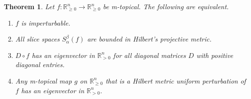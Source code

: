 \documentclass[10pt,reqno]{amsart}
\newcommand{\R}{\mathbb{R}}
\theoremstyle{plain}
\newtheorem{theorem}{Theorem}[section]
\theoremstyle{definition}
\numberwithin{equation}{section}
\begin{document}
\begin{theorem} \label{thm:slice}
Let $f: \R^n_{\ge 0} \rightarrow \R^n_{\ge 0}$ be m-topical. The following are equivalent. 
\begin{enumerate}
\item \label{item:def} $f$ is imperturbable.
\item \label{item:slice} All slice spaces $S_\alpha^\beta(f)$ are bounded in Hilbert's projective metric. 
\item \label{item:D} $D \circ f$ has an eigenvector in $\R^n_{>0}$ for all diagonal matrices $D$ with positive diagonal entries. 
\item \label{item:perturb} Any m-topical map $g$ on $\R^n_{\ge 0}$ that is a Hilbert metric uniform perturbation of $f$ has an eigenvector in $\R^n_{>0}$. 
\end{enumerate}
\end{theorem}
\end{document}
